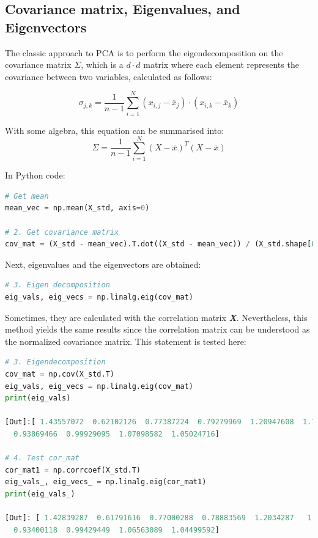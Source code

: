 \subsection{Covariance matrix, Eigenvalues, and Eigenvectors}
The classic approach to PCA is to perform the eigendecomposition on the covariance matrix $\Sigma$, which is a $d \cdot d$ matrix where each element represents the covariance between two variables, calculated as follows:

$$
\sigma_{j,k} = \frac{1}{n-1}\sum_{i=1}^N {(x_{i,j} - \overline{x}_{j})} \cdot {(x_{i,k} - \overline{x}_{k})}
$$

With some algebra, this equation can be summarised into:
$$
\Sigma = \frac{1}{n-1}\sum_{i=1}^N {(X - \overline{x})^T}{(X - \overline{x})}
$$

In Python code:

\begin{lstlisting}[language=Python]
# Get mean
mean_vec = np.mean(X_std, axis=0)

# 2. Get covariance matrix
cov_mat = (X_std - mean_vec).T.dot((X_std - mean_vec)) / (X_std.shape[0]-1)
\end{lstlisting}

Next, eigenvalues and the eigenvectors are obtained:

\begin{lstlisting}[language=Python]
# 3. Eigen decomposition
eig_vals, eig_vecs = np.linalg.eig(cov_mat)
\end{lstlisting}

Sometimes, they are calculated with the correlation matrix \textbf{\emph{X}}. Nevertheless, this method yields the same results since the correlation matrix can be understood as the normalized covariance matrix. This statement is tested here:

\begin{lstlisting}[language=Python]
# 3. Eigendecomposition
cov_mat = np.cov(X_std.T)
eig_vals, eig_vecs = np.linalg.eig(cov_mat)
print(eig_vals)

[Out]:[ 1.43557072  0.62102126  0.77387224  0.79279969  1.20947608  1.15829268
  0.93869466  0.99929095  1.07098582  1.05024716]

# 4. Test cor_mat
cor_mat1 = np.corrcoef(X_std.T)
eig_vals_, eig_vecs_ = np.linalg.eig(cor_mat1)
print(eig_vals_)

[Out]: [ 1.42839287  0.61791616  0.77000288  0.78883569  1.2034287   1.15250122
  0.93400118  0.99429449  1.06563089  1.04499592]

\end{lstlisting}


